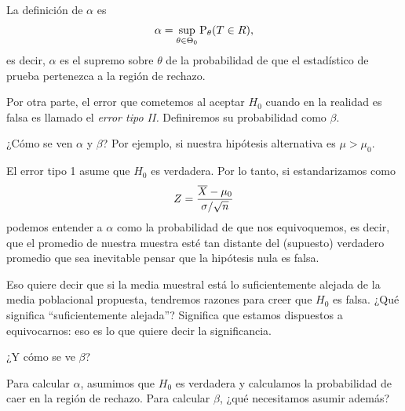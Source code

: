 \formal
La definición de \(\alpha\) es \[\alpha = \sup_{\theta \in \Theta_0} \operatorname{P}_{\theta}(T\in R),\] es decir, \(\alpha\) es el supremo sobre \(\theta\) de la probabilidad de que el estadístico de prueba pertenezca a la región de rechazo.

\informal
Por otra parte, el error que cometemos al aceptar \(H_0\) cuando en la realidad es falsa es llamado el \emph{error tipo II.} Definiremos su probabilidad como \(\beta\). 

¿Cómo se ven \(\alpha\) y \(\beta\)? Por ejemplo, si nuestra hipótesis alternativa es \(\mu>\mu_0\).



El error tipo 1 asume que \(H_0\) es verdadera. Por lo tanto, si estandarizamos como \[Z=\frac{\overline{X} - \mu_0}{\sigma/\sqrt{n}}\] podemos entender a \(\alpha\) como la probabilidad de que nos equivoquemos, es decir, que el promedio de nuestra muestra esté tan distante del (supuesto) verdadero promedio que sea inevitable pensar que la hipótesis nula es falsa.

Eso quiere decir que si la media muestral está lo suficientemente alejada de la media poblacional propuesta, tendremos razones para creer que \(H_0\) es falsa. ¿Qué significa \enquote{suficientemente alejada}? Significa que estamos dispuestos a equivocarnos: eso es lo que quiere decir la significancia.

¿Y cómo se ve \(\beta\)?

\begin{pausa}
Para calcular \(\alpha\), asumimos que \(H_0\) es verdadera y calculamos la probabilidad de caer en la región de rechazo. Para calcular \(\beta\), ¿qué necesitamos asumir además?
\end{pausa}

